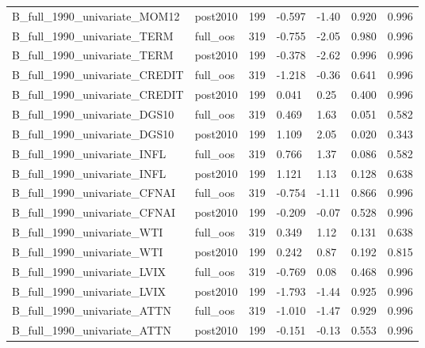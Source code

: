 \begin{table}
\begin{tabular}{llrllll}
B\_full\_1990\_univariate\_MOM12 & post2010 & 199 & -0.597 & -1.40 & 0.920 & 0.996 \\
B\_full\_1990\_univariate\_TERM & full\_oos & 319 & -0.755 & -2.05 & 0.980 & 0.996 \\
B\_full\_1990\_univariate\_TERM & post2010 & 199 & -0.378 & -2.62 & 0.996 & 0.996 \\
B\_full\_1990\_univariate\_CREDIT & full\_oos & 319 & -1.218 & -0.36 & 0.641 & 0.996 \\
B\_full\_1990\_univariate\_CREDIT & post2010 & 199 & 0.041 & 0.25 & 0.400 & 0.996 \\
B\_full\_1990\_univariate\_DGS10 & full\_oos & 319 & 0.469 & 1.63 & 0.051 & 0.582 \\
B\_full\_1990\_univariate\_DGS10 & post2010 & 199 & 1.109 & 2.05 & 0.020 & 0.343 \\
B\_full\_1990\_univariate\_INFL & full\_oos & 319 & 0.766 & 1.37 & 0.086 & 0.582 \\
B\_full\_1990\_univariate\_INFL & post2010 & 199 & 1.121 & 1.13 & 0.128 & 0.638 \\
B\_full\_1990\_univariate\_CFNAI & full\_oos & 319 & -0.754 & -1.11 & 0.866 & 0.996 \\
B\_full\_1990\_univariate\_CFNAI & post2010 & 199 & -0.209 & -0.07 & 0.528 & 0.996 \\
B\_full\_1990\_univariate\_WTI & full\_oos & 319 & 0.349 & 1.12 & 0.131 & 0.638 \\
B\_full\_1990\_univariate\_WTI & post2010 & 199 & 0.242 & 0.87 & 0.192 & 0.815 \\
B\_full\_1990\_univariate\_LVIX & full\_oos & 319 & -0.769 & 0.08 & 0.468 & 0.996 \\
B\_full\_1990\_univariate\_LVIX & post2010 & 199 & -1.793 & -1.44 & 0.925 & 0.996 \\
B\_full\_1990\_univariate\_ATTN & full\_oos & 319 & -1.010 & -1.47 & 0.929 & 0.996 \\
B\_full\_1990\_univariate\_ATTN & post2010 & 199 & -0.151 & -0.13 & 0.553 & 0.996 \\
\bottomrule
\end{tabular}
\end{table}
